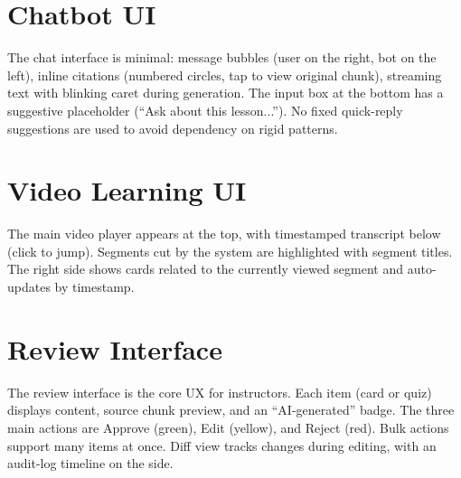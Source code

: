 \section{Chatbot UI}
\label{appendix:ui-chatbot}

The chat interface is minimal: message bubbles (user on the right, bot on
the left), inline citations (numbered circles, tap to view original
chunk), streaming text with blinking caret during generation. The input
box at the bottom has a suggestive placeholder (``Ask about this
lesson...''). No fixed quick-reply suggestions are used to avoid
dependency on rigid patterns.

\section{Video Learning UI}
\label{appendix:ui-video-learning}

The main video player appears at the top, with timestamped transcript
below (click to jump). Segments cut by the system are highlighted with
segment titles. The right side shows cards related to the currently
viewed segment and auto-updates by timestamp.

\section{Review Interface}
\label{appendix:ui-review}

The review interface is the core UX for instructors. Each item (card or
quiz) displays content, source chunk preview, and an ``AI-generated''
badge. The three main actions are Approve (green), Edit (yellow), and
Reject (red). Bulk actions support many items at once. Diff view tracks
changes during editing, with an audit-log timeline on the side.
